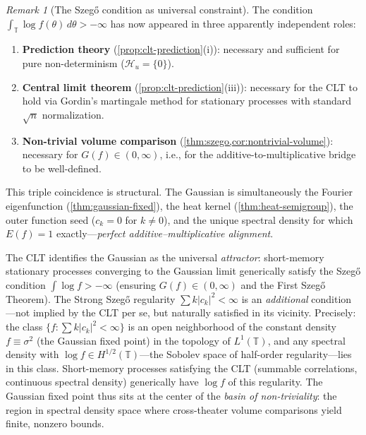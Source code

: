 \documentclass[12pt]{amsart}
\theoremstyle{definition}
\theoremstyle{remark}
\newtheorem*{remark}{Remark}
\newcommand{\bT}{\mathbb{T}}
\begin{document}
\begin{remark}[The Szeg\H{o} condition as universal constraint]
The condition $\int_{\bT} \log f(\theta)\, d\theta > -\infty$ has now appeared in three apparently independent roles:
\begin{enumerate}
\item \textbf{Prediction theory} (\cref{prop:clt-prediction}(i)): necessary and sufficient for pure non-determinism ($\mathcal{H}_u = \{0\}$).
\item \textbf{Central limit theorem} (\cref{prop:clt-prediction}(iii)): necessary for the CLT to hold via Gordin's martingale method for stationary processes with standard $\sqrt{n}$ normalization.
\item \textbf{Non-trivial volume comparison} (\cref{thm:szego,cor:nontrivial-volume}): necessary for $G(f) \in (0, \infty)$, i.e., for the additive-to-multiplicative bridge to be well-defined.
\end{enumerate}
This triple coincidence is structural. The Gaussian is simultaneously the Fourier eigenfunction (\cref{thm:gaussian-fixed}), the heat kernel (\cref{thm:heat-semigroup}), the outer function seed ($c_k = 0$ for $k \neq 0$), and the unique spectral density for which $E(f) = 1$ exactly---\emph{perfect additive--multiplicative alignment}.

The CLT identifies the Gaussian as the universal \emph{attractor}: short-memory stationary processes converging to the Gaussian limit generically satisfy the Szeg\H{o} condition $\int \log f > -\infty$ (ensuring $G(f) \in (0,\infty)$ and the First Szeg\H{o} Theorem). The Strong Szeg\H{o} regularity $\sum k|c_k|^2 < \infty$ is an \emph{additional} condition---not implied by the CLT per se, but naturally satisfied in its vicinity. Precisely: the class $\{f : \sum k|c_k|^2 < \infty\}$ is an open neighborhood of the constant density $f \equiv \sigma^2$ (the Gaussian fixed point) in the topology of $L^1(\bT)$, and any spectral density with $\log f \in H^{1/2}(\bT)$---the Sobolev space of half-order regularity---lies in this class. Short-memory processes satisfying the CLT (summable correlations, continuous spectral density) generically have $\log f$ of this regularity. The Gaussian fixed point thus sits at the center of the \emph{basin of non-triviality}: the region in spectral density space where cross-theater volume comparisons yield finite, nonzero bounds.
\end{remark}
\end{document}
